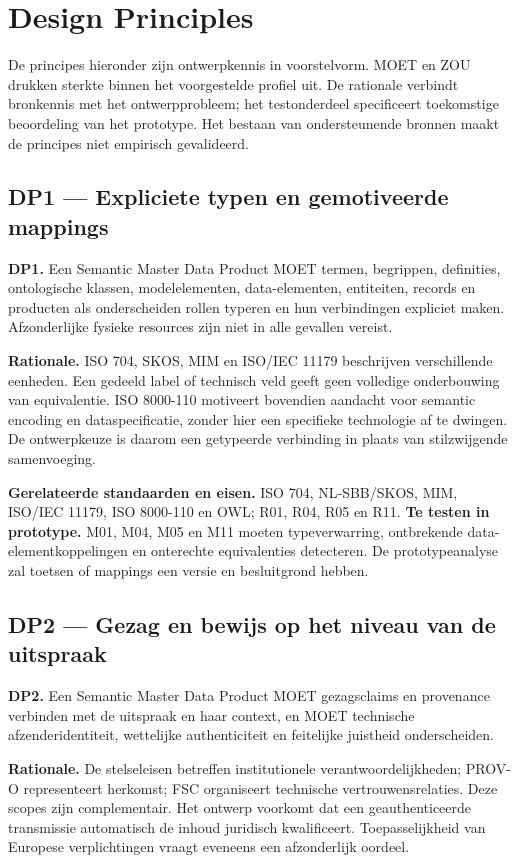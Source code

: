 \section{Design Principles}
\label{sec:principles}
De principes hieronder zijn ontwerpkennis in voorstelvorm. MOET en ZOU drukken sterkte binnen het voorgestelde profiel uit. De rationale verbindt bronkennis met het ontwerpprobleem; het testonderdeel specificeert toekomstige beoordeling van het prototype. Het bestaan van ondersteunende bronnen maakt de principes niet empirisch gevalideerd.

\subsection*{DP1 --- Expliciete typen en gemotiveerde mappings}
\textbf{DP1.} Een Semantic Master Data Product MOET termen, begrippen, definities, ontologische klassen, modelelementen, data-elementen, entiteiten, records en producten als onderscheiden rollen typeren en hun verbindingen expliciet maken. Afzonderlijke fysieke resources zijn niet in alle gevallen vereist.

\textbf{Rationale.} ISO 704, SKOS, MIM en ISO/IEC 11179 beschrijven verschillende eenheden. \citep{S11,S31,S13,S08} Een gedeeld label of technisch veld geeft geen volledige onderbouwing van equivalentie. ISO 8000-110 motiveert bovendien aandacht voor semantic encoding en dataspecificatie, zonder hier een specifieke technologie af te dwingen. \citep{S03} De ontwerpkeuze is daarom een getypeerde verbinding in plaats van stilzwijgende samenvoeging.

\textbf{Gerelateerde standaarden en eisen.} ISO 704, NL-SBB/SKOS, MIM, ISO/IEC 11179, ISO 8000-110 en OWL; R01, R04, R05 en R11. \textbf{Te testen in prototype.} M01, M04, M05 en M11 moeten typeverwarring, ontbrekende data-elementkoppelingen en onterechte equivalenties detecteren. De prototypeanalyse zal toetsen of mappings een versie en besluitgrond hebben.

\subsection*{DP2 --- Gezag en bewijs op het niveau van de uitspraak}
\textbf{DP2.} Een Semantic Master Data Product MOET gezagsclaims en provenance verbinden met de uitspraak en haar context, en MOET technische afzenderidentiteit, wettelijke authenticiteit en feitelijke juistheid onderscheiden.

\textbf{Rationale.} De stelseleisen betreffen institutionele verantwoordelijkheden; PROV-O representeert herkomst; FSC organiseert technische vertrouwensrelaties. \citep{S25,S33,S21} Deze scopes zijn complementair. Het ontwerp voorkomt dat een geauthenticeerde transmissie automatisch de inhoud juridisch kwalificeert. Toepasselijkheid van Europese verplichtingen vraagt eveneens een afzonderlijk oordeel. \citep{S42,S43}

